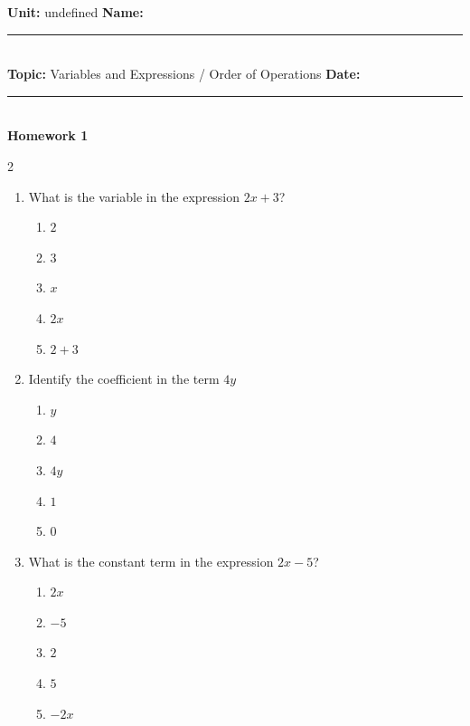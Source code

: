 \documentclass[10pt]{article}
\begin{document}
\enlargethispage{2.5cm}

\begin{tcolorbox}[colback=mainblue!5, colframe=mainblue, sharp corners, boxrule=0.5pt]
    \small \textbf{Unit:} undefined \hfill \textbf{Name:} \rule{3cm}{0.4pt} \\
    \small \textbf{Topic:} Variables and Expressions / Order of Operations \hfill \textbf{Date:} \rule{2cm}{0.4pt} \\
    \centering \textbf{\large Homework 1}
\end{tcolorbox}

\vspace{0.2cm}

\begin{multicols}{2}
\begin{enumerate}[label=\textbf{Q\arabic*.}, leftmargin=*, itemsep=6pt, parsep=0pt]

  \item \small What is the variable in the expression $2x + 3$?
  \begin{enumerate}[label=(\Alph*), leftmargin=0.6cm, nosep, itemsep=2pt]
    \item $2$
    \item $3$
    \item $x$
    \item $2x$
    \item $2 + 3$
  \end{enumerate}

  \item \small Identify the coefficient in the term $4y$
  \begin{enumerate}[label=(\Alph*), leftmargin=0.6cm, nosep, itemsep=2pt]
    \item $y$
    \item $4$
    \item $4y$
    \item $1$
    \item $0$
  \end{enumerate}

  \item \small What is the constant term in the expression $2x - 5$?
  \begin{enumerate}[label=(\Alph*), leftmargin=0.6cm, nosep, itemsep=2pt]
    \item $2x$
    \item $-5$
    \item $2$
    \item $5$
    \item $-2x$
  \end{enumerate}


\end{enumerate}
\end{multicols}
\end{document}
